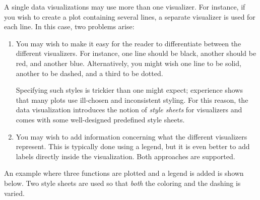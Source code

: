 A single data visualizations may use more than one visualizer. For instance, if
you wish to create a plot containing several lines, a separate visualizer is
used for each line. In this case, two problems arise:
%
\begin{enumerate}
    \item You may wish to make it easy for the reader to differentiate between
        the different visualizers. For instance, one line should be black,
        another should be red, and another blue. Alternatively, you might wish
        one line to be solid, another to be dashed, and a third to be dotted.

        Specifying such styles is trickier than one might expect; experience
        shows that many plots use ill-chosen and inconsistent styling. For this
        reason, the data visualization introduces the notion of \emph{style
        sheets} for visualizers and comes with some well-designed predefined
        style sheets.
    \item You may wish to add information concerning what the different
        visualizers represent. This is typically done using a legend, but it is
        even better to add labels directly inside the visualization. Both
        approaches are supported.
\end{enumerate}

An example where three functions are plotted and a legend is added is shown
below. Two style sheets are used so that \emph{both} the coloring and the
dashing is varied.
%
\begin{codeexample}[]
\end{codeexample}

